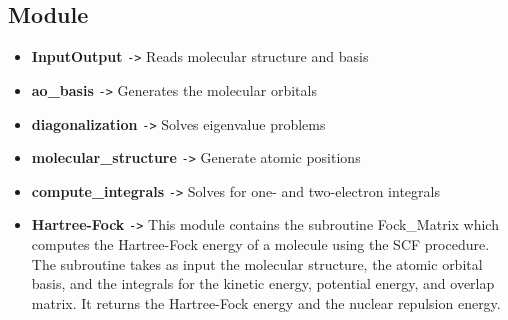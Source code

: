 \documentclass[11pt,a4paper]{article}
\begin{document}
\subsection*{Module}
\begin{itemize}
    \item \textbf{InputOutput} \texttt{->} Reads molecular structure and basis
    \item \textbf{ao\_basis} \texttt{->} Generates the molecular orbitals
    \item \textbf{diagonalization} \texttt{->} Solves eigenvalue problems
    \item \textbf{molecular\_structure} \texttt{->} Generate atomic positions
    \item \textbf{compute\_integrals} \texttt{->} Solves for one- and two-electron integrals
    \item \textbf{Hartree-Fock} \texttt{->} This module contains the subroutine Fock_Matrix which computes the Hartree-Fock energy of a molecule using the SCF procedure. The subroutine takes 
    as input the molecular structure, the atomic orbital basis, and the integrals for the kinetic energy, potential energy, and overlap matrix. It returns the Hartree-Fock energy and the nuclear repulsion energy. 
\end{itemize}
\end{document}
